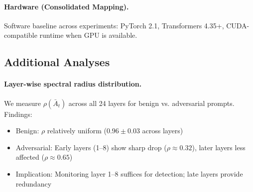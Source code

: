 \documentclass[10pt,twocolumn]{article}
\begin{document}
\paragraph{Hardware (Consolidated Mapping).}
\begin{table}[t]
\centering
\caption{Appendix A.4: experiment-to-hardware mapping.}
\label{tab:hardware_map}
\vspace{2pt}
\begin{minipage}{\columnwidth}
{\footnotesize Software baseline across experiments: PyTorch 2.1, Transformers 4.35+, CUDA-compatible runtime when GPU is available.}
\end{minipage}
\end{table}

\subsection{Additional Analyses}
\label{sec:additional_analyses}
\paragraph{Layer-wise spectral radius distribution.}
We measure $\rho(\bar{A}_t)$ across all 24 layers for benign vs. adversarial prompts. Findings:
\begin{itemize}
\item Benign: $\rho$ relatively uniform ($0.96 \pm 0.03$ across layers)
\item Adversarial: Early layers (1--8) show sharp drop ($\rho \approx 0.32$), later layers less affected ($\rho \approx 0.65$)
\item Implication: Monitoring layer 1--8 suffices for detection; late layers provide redundancy
\end{itemize}
\end{document}
